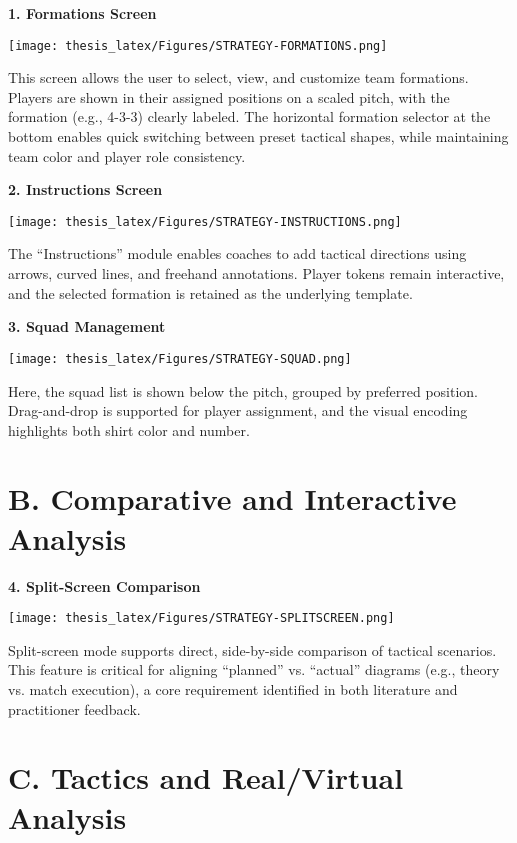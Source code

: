 \documentclass[11pt,a4paper,openright]{report}
\begin{document}
\textbf{1. Formations Screen}\
\begin{center}
\texttt{[image: thesis\_latex/Figures/STRATEGY-FORMATIONS.png]}
\end{center}
\noindent
This screen allows the user to select, view, and customize team formations. Players are shown in their assigned positions on a scaled pitch, with the formation (e.g., 4-3-3) clearly labeled. The horizontal formation selector at the bottom enables quick switching between preset tactical shapes, while maintaining team color and player role consistency.

\textbf{2. Instructions Screen}\
\begin{center}
\texttt{[image: thesis\_latex/Figures/STRATEGY-INSTRUCTIONS.png]}
\end{center}
\noindent
The “Instructions” module enables coaches to add tactical directions using arrows, curved lines, and freehand annotations. Player tokens remain interactive, and the selected formation is retained as the underlying template.

\textbf{3. Squad Management}\
\begin{center}
\texttt{[image: thesis\_latex/Figures/STRATEGY-SQUAD.png]}
\end{center}
\noindent
Here, the squad list is shown below the pitch, grouped by preferred position. Drag-and-drop is supported for player assignment, and the visual encoding highlights both shirt color and number.

\section*{B. Comparative and Interactive Analysis}

\textbf{4. Split-Screen Comparison}\
\begin{center}
\texttt{[image: thesis\_latex/Figures/STRATEGY-SPLITSCREEN.png]}
\end{center}
\noindent
Split-screen mode supports direct, side-by-side comparison of tactical scenarios. This feature is critical for aligning “planned” vs. “actual” diagrams (e.g., theory vs. match execution), a core requirement identified in both literature and practitioner feedback.

\section*{C. Tactics and Real/Virtual Analysis}
\end{document}
